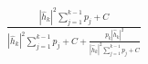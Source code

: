 \documentclass[preview]{standalone}
\begin{document}
\begin{align*}
\frac{\left|{\hat{h}_k}\right|^2\sum_{j=1}^{k-1}p_j+ C}{\left|{\hat{h}_k}\right|^2\sum_{j=1}^{k-1}p_j+ C + \frac{p_k\left|{\hat{h}_k}\right|^2}{\left|{\hat{h}_k}\right|^2\sum_{j=1}^{k-1}p_j+ C}}
\end{align*}
\end{document}
